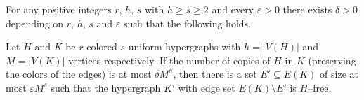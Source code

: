  \begin {theorem} 
  \label {t.rem_lem_edge_color_hyper} For any positive integers $r$, $h$, $s$ with $h\ge s\ge 2$ and every $\varepsilon >0$ there exists $\delta >0$ depending on $r$, $h$, $s$ and $\varepsilon $ such that the following holds. \par Let $H$ and $K$ be $r$-colored $s$-uniform hypergraphs with $h=|V(H)|$ and $M=|V(K)|$ vertices respectively. If the number of copies of $H$ in $K$ (preserving the colors of the edges) is at most $\delta M^h$, then there is a set $E'\subseteq E(K)$ of size at most $\varepsilon M^{s}$ such that the hypergraph $K'$ with edge set $E(K)\setminus E'$ is $H$--free. 
 \end {theorem} 
 
